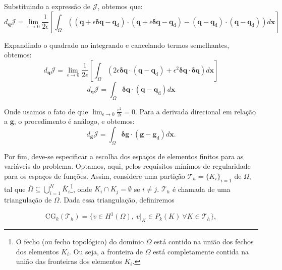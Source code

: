 Substituindo a expressão de $\boldsymbol{\mathcal{J}}$, obtemos que:
{\small
	\begin{equation}
		d_{\mathbf{q}}\boldsymbol{\mathcal{J}} = \lim_{\epsilon \to 0} \frac{1}{2\epsilon} \left[ \int_{\Omega} \left( (\mathbf{q} + \epsilon \mathbf{\delta q} - \mathbf{q}_{\text{d}}) \cdot (\mathbf{q} + \epsilon \mathbf{\delta q} - \mathbf{q}_{\text{d}}) - (\mathbf{q} - \mathbf{q}_{\text{d}}) \cdot (\mathbf{q} - \mathbf{q}_{\text{d}}) \right) d\mathbf{x} \right]
	\end{equation}
}

Expandindo o quadrado no integrando e cancelando termos semelhantes, obtemos:
\begin{equation}
	d_{\mathbf{q}}\boldsymbol{\mathcal{J}} = \lim_{\epsilon \to 0} \frac{1}{2\epsilon} \left[ \int_{\Omega} \left( 2\epsilon \mathbf{\delta q} \cdot (\mathbf{q} - \mathbf{q}_{\text{d}}) + \epsilon^2 \mathbf{\delta q} \cdot \mathbf{\delta q} \right) d\mathbf{x} \right]
\end{equation}
\begin{equation}
	d_{\mathbf{q}}\boldsymbol{\mathcal{J}} = \int_{\Omega} \mathbf{\delta q} \cdot (\mathbf{q} - \mathbf{q}_{\text{d}}) d\mathbf{x}
\end{equation}

Onde usamos o fato de que  $\lim_{\epsilon \to 0} \frac{\epsilon^2}{2\epsilon} = 0$. Para a derivada direcional em relação a $\mathbf{g}$, o procedimento é análogo, e obtemos:
\begin{equation}
	d_{\mathbf{g}}\boldsymbol{\mathcal{J}} = \int_{\Omega} \mathbf{\delta g} \cdot (\mathbf{g} - \mathbf{g}_{\text{d}}) d\mathbf{x}.
\end{equation}

Por fim, deve-se especificar a escolha dos espaços de elementos finitos para as variáveis do problema. Optamos, aqui, pelos requisitos mínimos de regularidade para os espaços de funções. Assim, considere uma partição $\mathcal{T}_h = \{K_i\}_{i=1}$ de $\Omega$, tal que $\overline{\Omega} \subseteq \bigcup_{i=1}^{N} \overline{K}_i$\footnote{O fecho (ou fecho topológico) do domínio \(\Omega\) está contido na união dos fechos dos elementos \(K_i\). Ou seja, a fronteira de \(\Omega\) está completamente contida na união das fronteiras dos elementos \(K_i\).}, onde $K_i \cap K_j = \emptyset$ se $i \neq j$. $\mathcal{T}_h$ é chamada de uma triangulação de $\Omega$. Dada essa triangulação, definiremos 

\begin{equation}
	\text{CG}_k(\mathcal{T}_h) = \{ v \in H^1(\Omega),~ v|_K \in P_k(K)~\forall K \in \mathcal{T}_h\},    
\end{equation}

